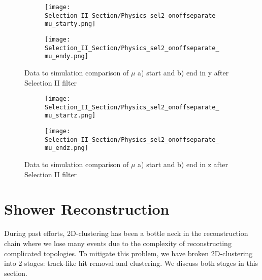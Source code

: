 \begin{figure}[t!]
\centering
  \begin{subfigure}[t]{0.3\textwidth}
    \centering
\texttt{[image: Selection\_II\_Section/Physics\_sel2\_onoffseparate\_mu\_starty.png]}
   \caption{ }
  \end{subfigure} 
  \hspace{30 mm}
  \begin{subfigure}[t]{0.3\textwidth}
    \centering
\texttt{[image: Selection\_II\_Section/Physics\_sel2\_onoffseparate\_mu\_endy.png]}
   \caption{ }
  \end{subfigure} 
\caption{ Data to simulation comparison of $\mu$ a) start and b) end in y after Selection II filter }
\label{fig:physics_sel2_y}
\end{figure}

\begin{figure}[t!]
\centering
  \begin{subfigure}[t]{0.3\textwidth}
    \centering
\texttt{[image: Selection\_II\_Section/Physics\_sel2\_onoffseparate\_mu\_startz.png]}
   \caption{ }
  \end{subfigure} 
  \hspace{30mm}
  \begin{subfigure}[t]{0.3\textwidth}
    \centering
\texttt{[image: Selection\_II\_Section/Physics\_sel2\_onoffseparate\_mu\_endz.png]}
   \caption{ }
  \end{subfigure} 

\caption{ Data to simulation comparison of $\mu$ a) start and b) end in z after Selection II filter }
\label{fig:physics_sel2_z}
\end{figure}




\clearpage
\section{Shower Reconstruction}
During past efforts, 2D-clustering has been a bottle neck in the reconstruction chain where we lose many events due to the complexity of reconstructing complicated topologies. To mitigate this problem, we have broken 2D-clustering into 2 stages: track-like hit removal and clustering. We discuss both stages in this section.

